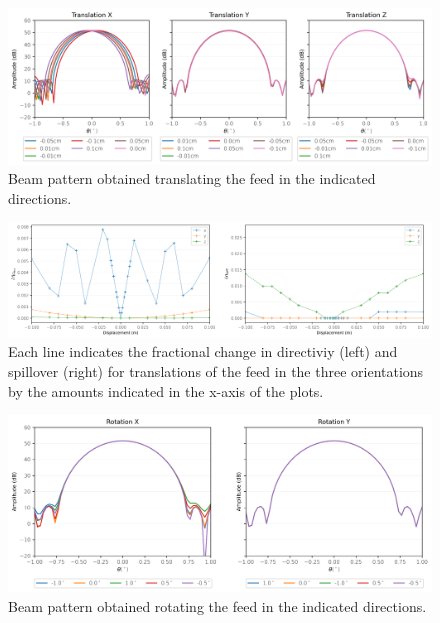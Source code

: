\documentclass{ws-jai}
\begin{document}
\begin{figure}
\begin{center}
\includegraphics[width=7in]{figs/01_feed_trans_XYZ}
\end{center}
\caption{Beam pattern obtained translating the feed in the indicated directions.}
\label{fig:feed_trans_XYZ}
\end{figure}

\begin{figure}
\begin{center}
\includegraphics[width=7in]{figs/02_feed_trans_XYZ_bounds}
\end{center}
\caption{Each line indicates the fractional change in directiviy (left) and spillover (right) for translations of the feed in the three orientations by the amounts indicated in the x-axis of the plots.}
\label{fig:feed_trans_XYZ_bounds}
\end{figure}

\begin{figure}
\begin{center}
\includegraphics[width=7in]{figs/03_feed_rot_XY}
\end{center}
\caption{Beam pattern obtained rotating the feed in the indicated directions.}
\label{fig:feed_rot_XY}
\end{figure}
\end{document}
